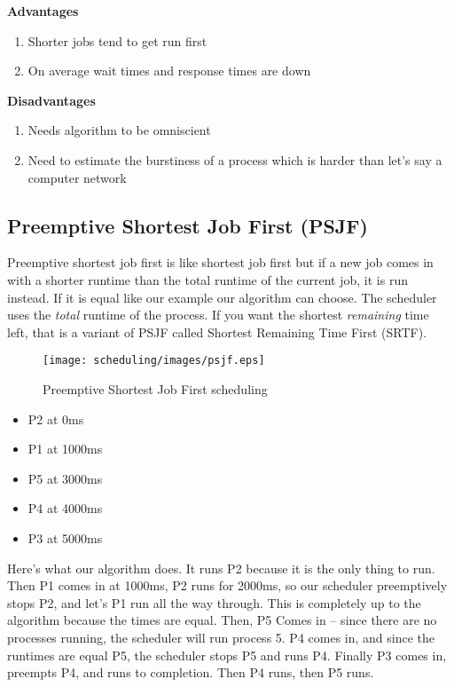 \textbf{Advantages}

\begin{enumerate}
  \item Shorter jobs tend to get run first
  \item On average wait times and response times are down
\end{enumerate}

\textbf{Disadvantages}
\begin{enumerate}
  \item Needs algorithm to be omniscient
  \item Need to estimate the burstiness of a process which is harder than let's say a computer network
\end{enumerate}

\subsection{Preemptive Shortest Job First (PSJF)}

Preemptive shortest job first is like shortest job first but if a new job comes in with a shorter runtime than the total runtime of the current job, it is run instead.
If it is equal like our example our algorithm can choose.
The scheduler uses the \emph{total} runtime of the process.
If you want the shortest \emph{remaining} time left, that is a variant of PSJF called Shortest Remaining Time First (SRTF).

\begin{figure}[htbp]
\centering
\texttt{[image: scheduling/images/psjf.eps]}
\caption{Preemptive Shortest Job First scheduling}
\end{figure}

\begin{itemize}
\tightlist
\item
  P2 at 0ms
\item
  P1 at 1000ms
\item
  P5 at 3000ms
\item
  P4 at 4000ms
\item
  P3 at 5000ms
\end{itemize}

Here's what our algorithm does.
It runs P2 because it is the only thing to run.
Then P1 comes in at 1000ms, P2 runs for 2000ms, so our scheduler preemptively stops P2, and let's P1 run all the way through.
This is completely up to the algorithm because the times are equal.
Then, P5 Comes in -- since there are no processes running, the scheduler will run process 5.
P4 comes in, and since the runtimes are equal P5, the scheduler stops P5 and runs P4.
Finally P3 comes in, preempts P4, and runs to completion.
Then P4 runs, then P5 runs.


